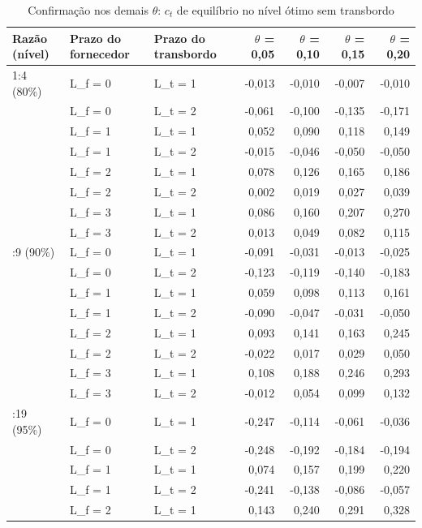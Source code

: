 \begin{table}[htbp]
\centering
\small
\caption{Confirmação nos demais $\theta$: $c_t$ de equilíbrio no nível ótimo sem transbordo}
\label{tab:tbr_ct_equilibrio_theta}
\begin{tabular}{lllrrrr}
\toprule
Razão (nível) & Prazo do fornecedor & Prazo do transbordo & $\theta$ = 0,05 & $\theta$ = 0,10 & $\theta$ = 0,15 & $\theta$ = 0,20 \\
\midrule
1:4 (80\%) & L\_f = 0 & L\_t = 1 & -0,013 & -0,010 & -0,007 & -0,010 \\
 & L\_f = 0 & L\_t = 2 & -0,061 & -0,100 & -0,135 & -0,171 \\
 & L\_f = 1 & L\_t = 1 & 0,052 & 0,090 & 0,118 & 0,149 \\
 & L\_f = 1 & L\_t = 2 & -0,015 & -0,046 & -0,050 & -0,050 \\
 & L\_f = 2 & L\_t = 1 & 0,078 & 0,126 & 0,165 & 0,186 \\
 & L\_f = 2 & L\_t = 2 & 0,002 & 0,019 & 0,027 & 0,039 \\
 & L\_f = 3 & L\_t = 1 & 0,086 & 0,160 & 0,207 & 0,270 \\
 & L\_f = 3 & L\_t = 2 & 0,013 & 0,049 & 0,082 & 0,115 \\
\addlinespace
1:9 (90\%) & L\_f = 0 & L\_t = 1 & -0,091 & -0,031 & -0,013 & -0,025 \\
 & L\_f = 0 & L\_t = 2 & -0,123 & -0,119 & -0,140 & -0,183 \\
 & L\_f = 1 & L\_t = 1 & 0,059 & 0,098 & 0,113 & 0,161 \\
 & L\_f = 1 & L\_t = 2 & -0,090 & -0,047 & -0,031 & -0,050 \\
 & L\_f = 2 & L\_t = 1 & 0,093 & 0,141 & 0,163 & 0,245 \\
 & L\_f = 2 & L\_t = 2 & -0,022 & 0,017 & 0,029 & 0,050 \\
 & L\_f = 3 & L\_t = 1 & 0,108 & 0,188 & 0,246 & 0,293 \\
 & L\_f = 3 & L\_t = 2 & -0,012 & 0,054 & 0,099 & 0,132 \\
\addlinespace
1:19 (95\%) & L\_f = 0 & L\_t = 1 & -0,247 & -0,114 & -0,061 & -0,036 \\
 & L\_f = 0 & L\_t = 2 & -0,248 & -0,192 & -0,184 & -0,194 \\
 & L\_f = 1 & L\_t = 1 & 0,074 & 0,157 & 0,199 & 0,220 \\
 & L\_f = 1 & L\_t = 2 & -0,241 & -0,138 & -0,086 & -0,057 \\
 & L\_f = 2 & L\_t = 1 & 0,143 & 0,240 & 0,291 & 0,328 \\

\end{tabular}
\end{table}
